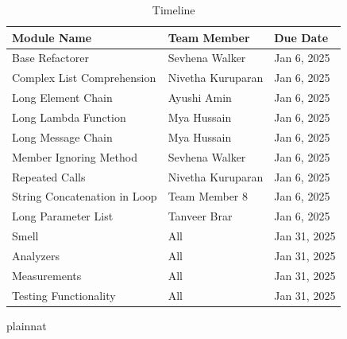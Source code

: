 \documentclass[12pt, titlepage]{article}
\begin{document}
\begin{table}[h!]
  \centering
  \caption{Timeline}
  \begin{tabular}{|l|l|l|}
  \hline
  \textbf{Module Name} & \textbf{Team Member}        & \textbf{Due Date} \\ \hline
  Base Refactorer                     & Sevhena Walker              & Jan 6, 2025    \\ \hline
  Complex List Comprehension          & Nivetha Kuruparan              & Jan 6, 2025    \\ \hline
  Long Element Chain                  & Ayushi Amin              & Jan 6, 2025     \\ \hline
  Long Lambda Function                & Mya Hussain              & Jan 6, 2025     \\ \hline
  Long Message Chain                  & Mya Hussain              & Jan 6, 2025     \\ \hline
  Member Ignoring Method              & Sevhena Walker             & Jan 6, 2025     \\ \hline
  Repeated Calls                      & Nivetha Kuruparan               & Jan 6, 2025     \\ \hline
  String Concatenation in Loop        & Team Member 8              & Jan 6, 2025     \\ \hline
  Long Parameter List                 & Tanveer Brar              & Jan 6, 2025     \\ \hline
  Smell                               & All             & Jan 31, 2025    \\ \hline
  Analyzers                           & All            & Jan 31, 2025      \\ \hline
  Measurements                        & All          & Jan 31, 2025      \\ \hline
  Testing Functionality               & All           & Jan 31, 2025      \\ \hline
  \end{tabular}
  \end{table}
  

 {plainnat}


\newpage{}
\end{document}
